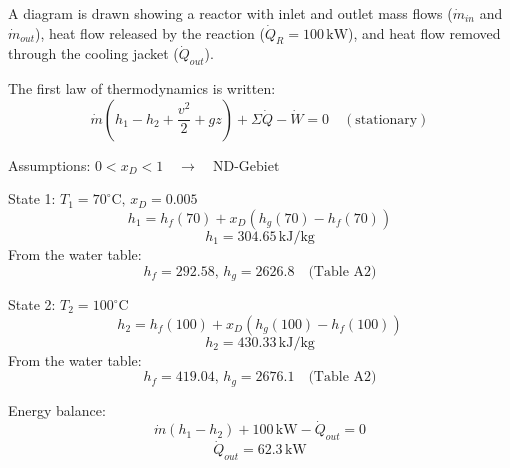 A diagram is drawn showing a reactor with inlet and outlet mass flows (\( \dot{m}_{in} \) and \( \dot{m}_{out} \)), heat flow released by the reaction (\( \dot{Q}_R = 100 \, \text{kW} \)), and heat flow removed through the cooling jacket (\( \dot{Q}_{out} \)).  

The first law of thermodynamics is written:  
\[
\dot{m}(h_1 - h_2 + \frac{v^2}{2} + gz) + \Sigma \dot{Q} - \dot{W} = 0 \quad (\text{stationary})
\]  

Assumptions:  
\( 0 < x_D < 1 \quad \rightarrow \quad \text{ND-Gebiet} \)  

State 1:  
\( T_1 = 70^\circ \text{C}, \, x_D = 0.005 \)  
\[
h_1 = h_f(70) + x_D(h_g(70) - h_f(70))
\]  
\[
h_1 = 304.65 \, \text{kJ/kg}
\]  
From the water table:  
\[
h_f = 292.58, \, h_g = 2626.8 \quad \text{(Table A2)}
\]  

State 2:  
\( T_2 = 100^\circ \text{C} \)  
\[
h_2 = h_f(100) + x_D(h_g(100) - h_f(100))
\]  
\[
h_2 = 430.33 \, \text{kJ/kg}
\]  
From the water table:  
\[
h_f = 419.04, \, h_g = 2676.1 \quad \text{(Table A2)}
\]  

Energy balance:  
\[
\dot{m}(h_1 - h_2) + 100 \, \text{kW} - \dot{Q}_{out} = 0
\]  
\[
\dot{Q}_{out} = 62.3 \, \text{kW}
\]